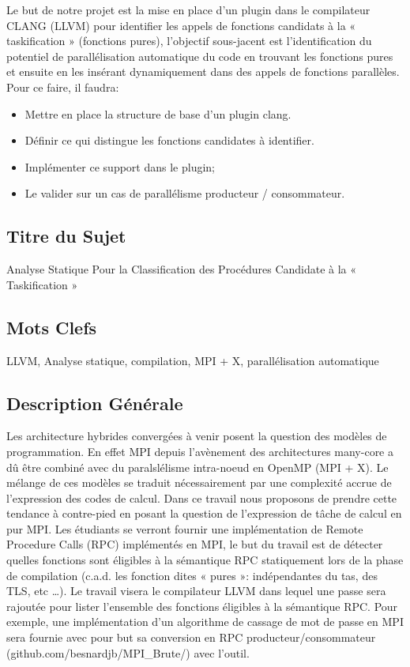 \documentclass[12pt,titlepage]{article}
\begin{document}
Le but de notre projet est la mise en place d’un plugin dans le compilateur CLANG (LLVM) pour identifier les appels de fonctions candidats à la « taskification » (fonctions pures), l'objectif sous-jacent est l'identification du potentiel de parallélisation automatique du code en trouvant les fonctions pures et ensuite en les insérant dynamiquement dans des appels de fonctions parallèles.\\
Pour ce faire, il faudra: \\

\begin{itemize}
	\item Mettre en place la structure de base d’un plugin clang.
	\item Définir ce qui distingue les fonctions candidates à identifier.
	\item Implémenter ce support dans le plugin;
	\item Le valider sur un cas de parallélisme producteur /
	consommateur.
\end{itemize}

\subsection{Titre du Sujet}

Analyse Statique Pour la Classification des Procédures Candidate à la « Taskification »


\subsection{Mots Clefs}

LLVM, Analyse statique, compilation, MPI + X, parallélisation automatique


\subsection{Description Générale}

Les architecture hybrides convergées à venir posent la question des modèles de programmation. En effet MPI depuis l’avènement des architectures many-core a dû être combiné avec du paralslélisme intra-noeud en OpenMP (MPI + X). Le mélange de ces modèles se traduit nécessairement par une complexité accrue de l’expression des codes de calcul. Dans ce travail nous proposons de prendre cette tendance à contre-pied en posant la question de l’expression de tâche de calcul en pur MPI. Les étudiants se verront fournir une implémentation de Remote Procedure Calls (RPC) implémentés en MPI, le but du travail est de détecter quelles fonctions sont éligibles à la sémantique RPC statiquement lors de la phase de compilation (c.a.d. les fonction dites « pures »: indépendantes du tas, des TLS, etc …). Le travail visera le compilateur LLVM dans lequel une passe sera rajoutée pour lister l’ensemble des fonctions éligibles à la sémantique RPC. Pour exemple, une implémentation d’un algorithme de cassage de mot de passe en MPI sera fournie avec pour but sa conversion en RPC producteur/consommateur (github.com/besnardjb/MPI\_Brute/) avec l’outil.
\end{document}

